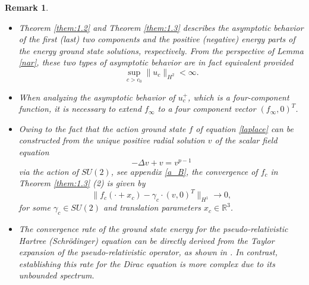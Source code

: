 \documentclass{amsart}
\theoremstyle{plain}
\newtheorem{remark}[theorem]{Remark}
\theoremstyle{definition}
\theoremstyle{remark}
\numberwithin{equation}{section} \numberwithin{figure}{section}
\begin{document}
 \begin{remark}\label{rem_1.7}
\begin{itemize}
  \item [(a)] Theorem \ref{them:1.2} and Theorem \ref{them:1.3} describes the asymptotic behavior of the first (last) 
  two components and the positive (negative) energy parts of the energy ground 
  state solutions, respectively. From the perspective of Lemma \ref{nar}, 
  these two types of asymptotic behavior are in fact equivalent provided  
  \[
  \sup_{c > c_0} \|u_c\|_{H^2} < \infty.
  \]
  \item[(b)] When analyzing the asymptotic behavior of \(u_c^+\), 
  which is a four-component function, it is necessary to extend
   \(f_\infty\) to a four component vector \((f_\infty, 0)^T\).
   \item[(c)]Owing to the fact that the action ground state $f$ of equation \eqref{laplace} can be constructed from the unique positive radial solution \(v\) of the scalar field equation  
\[
-\Delta v + v = v^{p-1}
\]  
via the action of \(SU(2)\), see appendix \ref{a_B}, the convergence of \(f_c\) in Theorem \ref{them:1.3} (2) is given by  
\[
\|f_c(\cdot + x_c) - \gamma_c \cdot (v, 0)^T\|_{H^1} \to 0,
\]  
for some \(\gamma_c \in SU(2)\) and translation parameters \(x_c \in \mathbb{R}^3\).
\item[(d)] The convergence rate of the ground state energy for the pseudo-relativistic Hartree (Schrödinger) equation can be directly derived from the Taylor expansion of the pseudo-relativistic operator, as shown in \cite{arXiv:2505.05917}. In contrast, establishing this rate for the Dirac equation is more complex due to its unbounded spectrum. 

\end{itemize}
   
\end{remark}
\end{document}
